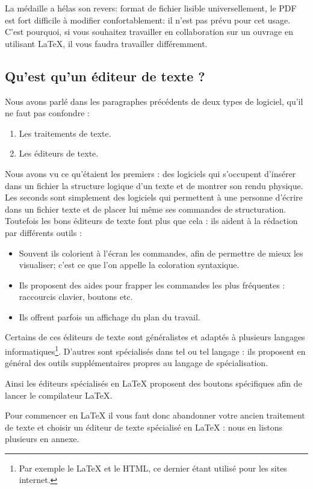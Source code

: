 La médaille a hélas son revers: format de fichier lisible universellement, le PDF est fort difficile à modifier confortablement: il n'est pas prévu pour cet usage. C'est pourquoi, si vous souhaitez travailler en collaboration sur un ouvrage en utilisant \LaTeX, il vous faudra travailler différemment.

\subsection{Qu'est qu'un éditeur de texte ?}

Nous avons parlé dans les paragraphes précédents de deux types de logiciel, qu'il ne faut pas confondre :
\begin{enumerate}
	\item Les traitements de texte.
	\item Les éditeurs de texte.
\end{enumerate}

Nous avons vu ce qu'étaient les premiers : des logiciels qui s'occupent d'insérer dans un fichier la structure logique d'un texte et de montrer son rendu physique.
Les seconds sont simplement des logiciels qui permettent à une personne d'écrire dans un fichier texte et de placer lui même ses commandes de structuration.
Toutefois les bons éditeurs de texte font plus que cela : ils aident à la rédaction par différents outils :
\begin{itemize}
\item Souvent ils colorient à l'écran les commandes, afin de permettre de mieux les visualiser; c'est ce que l'on appelle la coloration syntaxique.\label{colorationsyntax}
\item Ils proposent des aides pour frapper les commandes les plus fréquentes :  raccourcis clavier, boutons etc.
\item Ils offrent parfois un affichage du plan du travail.
\end{itemize}

Certains de ces éditeurs de texte sont généralistes et adaptés à plusieurs langages informatiques\footnote{Par exemple le \LaTeX{} et le HTML, ce dernier étant utilisé pour les sites internet.}. D'autres sont spécialisés dans tel ou tel langage : ils proposent en général des outils supplémentaires propres au langage de spécialisation. 

Ainsi les éditeurs spécialisés en \LaTeX{} proposent des boutons spécifiques afin de lancer le compilateur \LaTeX{}.

Pour commencer en \LaTeX{} il vous faut donc abandonner votre ancien traitement de texte et choisir un éditeur de texte spécialisé en \LaTeX{} : nous en listons plusieurs en annexe.

